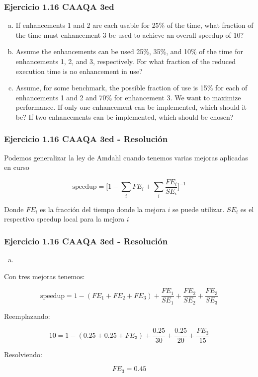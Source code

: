 \documentclass{beamer}
\begin{document}
\begin{frame}
\frametitle{Ejercicio 1.16 CAAQA 3ed}

\begin{enumerate}[a.]
\item If enhancements 1 and 2 are each usable for 25\% of the time, what fraction of the time must enhancement 3 be used to achieve an overall speedup of 10?
\item Assume the enhancements can be used 25\%, 35\%, and 10\% of the time for enhancements 1, 2, and 3, respectively. For what fraction of the reduced execution time is no enhancement in use?
\item Assume, for some benchmark, the possible fraction of use is 15\% for each of enhancements 1 and 2 and 70\% for enhancement 3. We want to maximize performance. If only one enhancement can be implemented, which should it be? If two enhancements can be implemented, which should be chosen?
\end{enumerate}
\end{frame}

\begin{frame}
\frametitle{Ejercicio 1.16 CAAQA 3ed - Resolución}

Podemos generalizar la ley de Amdahl cuando tenemos varias mejoras aplicadas en curso

\[ \text{speedup} = \bigg[1 - \sum_i FE_i + \sum_i \frac{FE_i}{SE_i} \bigg]^{-1} \]

Donde $FE_i$ es la fracción del tiempo donde la mejora $i$ se puede utilizar. $SE_i$ es el respectivo speedup local para la mejora $i$
\end{frame}

\begin{frame}
\frametitle{Ejercicio 1.16 CAAQA 3ed - Resolución}

\begin{enumerate}[a.]
\item
\end{enumerate}
Con tres mejoras tenemos:

\[ \text{speedup} = 1 - (FE_1+ FE_2 + FE_3) + \frac{FE_1}{SE_1} + \frac{FE_2}{SE_2} + \frac{FE_3}{SE_3} \]

Reemplazando:

\[ 10 = 1 - (0.25 + 0.25 + FE_3) + \frac{0.25}{30} + \frac{0.25}{20} + \frac{FE_3}{15} \]

Resolviendo:

\[ FE_3 = 0.45 \]

\end{frame}
\end{document}

